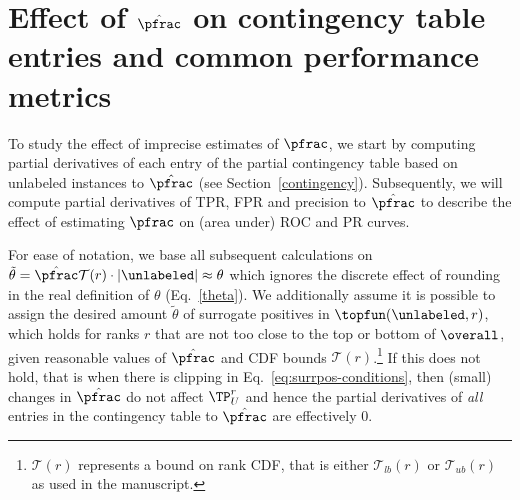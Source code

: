 \section{Effect of $\hat{\pfrac}$ on contingency table entries and common performance metrics} \label{partial}
To study the effect of imprecise estimates of $\pfrac$, we start by computing partial derivatives of each entry of the partial contingency table based on unlabeled instances to $\hat{\pfrac}$ (see Section~\ref{contingency}). Subsequently, we will compute partial derivatives of TPR, FPR and precision to $\hat{\pfrac}$ to describe the effect of estimating $\pfrac$ on (area under) ROC and PR curves.

For ease of notation, we base all subsequent calculations on $\tilde{\theta} = \hat{\pfrac} \mathcal{T}(r) \cdot |\unlabeled| \approx \theta$ which ignores the discrete effect of rounding in the real definition of $\theta$ (Eq.~\ref{theta}). We additionally assume it is possible to assign the desired amount $\tilde{\theta}$ of surrogate positives in $\topfun(\unlabeled, r)$, which holds for ranks $r$ that are not too close to the top or bottom of $\overall$, given reasonable values of $\hat{\pfrac}$ and CDF bounds $\mathcal{T}(r)$.\footnote{$\mathcal{T}(r)$ represents a bound on rank CDF, that is either $\mathcal{T}_{lb}(r)$ or $\mathcal{T}_{ub}(r)$ as used in the manuscript.} If this does not hold, that is when there is clipping in Eq.~\ref{eq:surrpos-conditions}, then (small) changes in $\hat{\pfrac}$ do not affect $\TP_U^r$ and hence the partial derivatives of \emph{all} entries in the contingency table to $\hat{\pfrac}$ are effectively 0.

